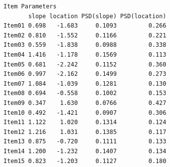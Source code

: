 \documentclass[
  a4paper,
]{ltjsbook}
\begin{document}
\begin{verbatim}
Item Parameters
       slope location PSD(slope) PSD(location)
Item01 0.698   -1.683     0.1093         0.266
Item02 0.810   -1.552     0.1166         0.221
Item03 0.559   -1.838     0.0988         0.338
Item04 1.416   -1.178     0.1569         0.113
Item05 0.681   -2.242     0.1152         0.360
Item06 0.997   -2.162     0.1499         0.273
Item07 1.084   -1.039     0.1281         0.130
Item08 0.694   -0.558     0.1002         0.153
Item09 0.347    1.630     0.0766         0.427
Item10 0.492   -1.421     0.0907         0.306
Item11 1.122    1.020     0.1314         0.124
Item12 1.216    1.031     0.1385         0.117
Item13 0.875   -0.720     0.1111         0.133
Item14 1.200   -1.232     0.1407         0.134
Item15 0.823   -1.203     0.1127         0.180


\end{verbatim}
\end{document}
